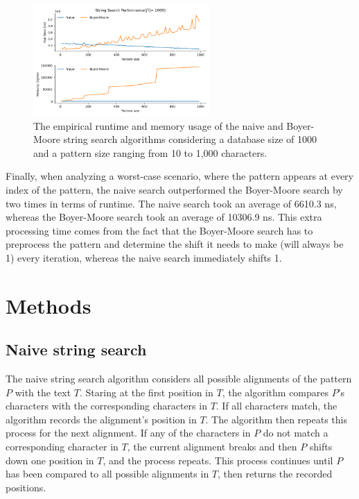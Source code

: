 \documentclass[11pt, letterpaper]{article}
\begin{document}
\begin{figure}[ht] \centering
    \includegraphics[width=0.6\textwidth]{t-1000_p-range.png}
    \caption{The empirical runtime and memory usage of the naive and Boyer-Moore string search
    algorithms considering a database size of 1000 and a pattern size ranging
    from 10 to 1,000 characters.}
    \label{timeandmem2}
\end{figure}

Finally, when analyzing a worst-case scenario, where the pattern appears at every index of the pattern, the naive search outperformed the Boyer-Moore search by two times in terms of runtime. The naive search took an average of 6610.3 ns, whereas the Boyer-Moore search took an average of 10306.9 ns. This extra processing time comes from the fact that the Boyer-Moore search has to preprocess the pattern and determine the shift it needs to make (will always be 1) every iteration, whereas the naive search immediately shifts 1.


\section{Methods}

\subsection{Naive string search}
The naive string search algorithm considers all possible alignments of the
pattern $P$ with the text $T$. Staring at the first position in $T$, the
algorithm compares $P$'s characters with the corresponding characters in $T$.
If all characters match, the algorithm records the alignment's position in $T$.
The algorithm then repeats this process for the next alignment. If any of the 
characters in $P$ do not match a corresponding character in $T$, the current
alignment breaks and then $P$ shifts down one position in $T$, and the process
repeats. This process continues until $P$ has been compared to all possible
alignments in $T$, then returns the recorded positions.
\end{document}
